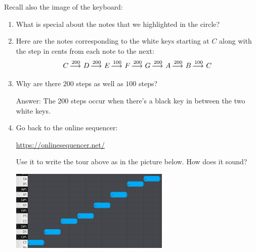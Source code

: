 \documentclass[12pt,noauthor,nooutcomes, instructornotes]{ximera}
\begin{document}
\begin{question}
Recall also the image of the keyboard:


\ttPianoNoStaff



\begin{enumerate}
\item What is special about the notes that we highlighted in the circle?

\answerlines

\answerlines



\item Here are the notes corresponding to the white keys starting at $C$ along with the step in cents from each note to the next: 
\[
C \mathop{\longrightarrow\,}\limits^{200} D \mathop{\longrightarrow\,}\limits^{200} E \mathop{\longrightarrow\,}\limits^{100} F \mathop{\longrightarrow\,}\limits^{200} G \mathop{\longrightarrow\,}\limits^{200} A \mathop{\longrightarrow\,}\limits^{200} B \mathop{\longrightarrow\,}\limits^{100} C
\]

    \item Why are there $200$ steps as well as $100$ steps?
\begin{instructorNotes}
Answer: The 200 steps occur when there's a black key in between the two white keys.
\end{instructorNotes}

\item  Go back to the online sequencer:

\begin{center}
    \url{https://onlinesequencer.net/}
  \end{center}
  
 Use it to write the tour above as in the picture below. How does it sound?
 
\begin{center}
\includegraphics[width=0.6\textwidth]{scales/C-major.png}
\end{center}


\end{enumerate}
\end{question}
\end{document}
